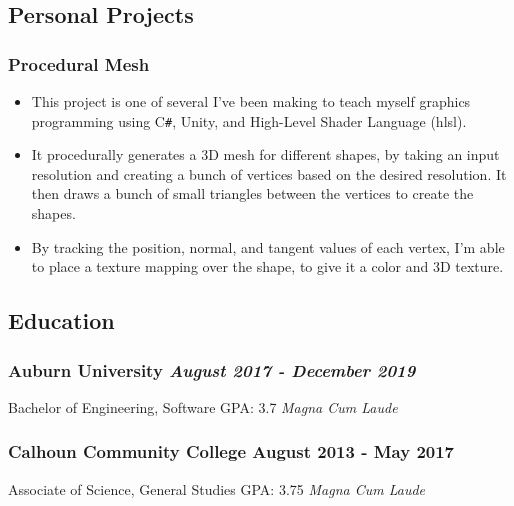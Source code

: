 \documentclass{article}
\begin{document}
\subsection*{Personal Projects}
\subsubsection*{\hspace*{0.15cm} Procedural Mesh}

\begin{itemize}
    \item This project is one of several I've been making to teach myself 
     graphics programming using C\verb|#|, Unity, and High-Level Shader Language (hlsl).
    \item It procedurally generates a 3D mesh for different shapes, by taking
     an input resolution and creating a bunch of vertices based on the desired resolution.
     It then draws a bunch of small triangles between the vertices to create the
     shapes. 
    \item By tracking the position, normal, and tangent values of each vertex, I'm
     able to place a texture mapping over the shape, to give it a color and 3D texture. 
\end{itemize}


\subsection*{Education}
\subsubsection*{Auburn University \hfill \textit{August 2017 - December 2019}}
Bachelor of Engineering, Software \hfill GPA: 3.7 \textit{Magna Cum Laude}
\subsubsection*{Calhoun Community College \hfill August 2013 - May 2017}
Associate of Science, General Studies \hfill GPA: 3.75 \textit{Magna Cum Laude}
\end{document}
